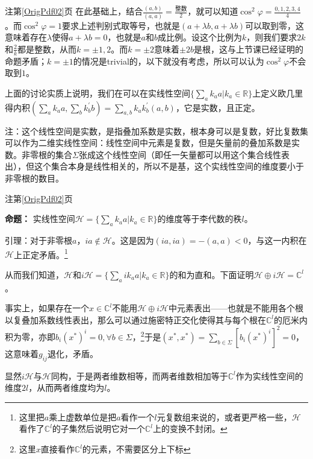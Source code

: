 \documentclass{beamer}
\newcommand{\refpage}[1]{注第\ref{OrigPdf#1}页}%
\begin{document}
\begin{frame}{\refpage{02}}
	在此基础上，结合$\frac{(a,b)}{(a,a)}=\frac{\text{整数}}{2}$，就可以知道$\cos^2\varphi=\frac{0,1,2,3,4}{4}$。而$\cos^2\varphi=1$要求上述判别式取等号，也就是$(a+\lambda b,a+\lambda b)$可以取到零，这意味着存在$\lambda$使得$a+\lambda b=0$，也就是$a$和$b$成比例。设这个比例为$k$，则我们要求$2k$和$\frac{2}{k}$都是整数，从而$k=\pm 1,2$。而$k=\pm 2$意味着$\pm 2b$是根，这与上节课已经证明的命题矛盾；$k=\pm 1$的情况是trivial的，以下就没有考虑，所以可以认为$\cos^2\varphi$不会取到$1$。
	
	上面的讨论实质上说明，我们在可以在实线性空间$\{\sum_a k_a a|k_a\in\mathbb R\}$上定义欧几里得内积$(\sum_a k_a a,\sum_b k_b^\prime b)=\sum_{a,b}k_ak_b^\prime (a,b)$，它是实数，且正定。
	
	注：这个线性空间是实数，是指叠加系数是实数，根本身可以是复数，好比复数集可以作为二维实线性空间：线性空间中元素是复数，但是矢量前的叠加系数是实数。非零根的集合$\Sigma$张成这个线性空间（即任一矢量都可以用这个集合线性表出），但这个集合本身是线性相关的，所以不是基，这个实线性空间的维度要小于非零根的数目。
\end{frame}

\begin{frame}{\refpage{02}}
	
	\textbf{命题：} 实线性空间$\mathcal H=\{\sum_a k_a a|k_a\in\mathbb R\}$的维度等于李代数的秩$l$。

	引理：对于非零根$a$，$ia\notin\mathcal H$。这是因为$(ia,ia)=-(a,a)<0$，与这一内积在$\mathcal H$上正定矛盾。\footnote{这里把$a$乘上虚数单位是把$a$看作一个$l$元复数组来说的，或者更严格一些，$\mathcal H$看作了$\mathbb C^l$的子集然后说明它对一个$\mathbb C^l$上的变换不封闭。}
	
	从而我们知道，$\mathcal H$和$i\mathcal H=\{\sum_a ik_a a|k_a\in\mathbb R\}$的和为直和。下面证明$\mathcal H\oplus i\mathcal H=\mathbb C^l$。
	
	事实上，如果存在一个$x\in \mathbb C^l$不能用$\mathcal H\oplus i\mathcal H$中元素表出——也就是不能用各个根以复叠加系数线性表出，那么可以通过施密特正交化使得其与每个根在$\mathbb C^l$的厄米内积为零，亦即$b_i(x^\ast)^i=0,\forall b\in\Sigma$，\footnote{这里$x$直接看作$\mathbb C^l$的元素，不需要区分上下标}于是$(x^\ast,x^\ast)=\sum_{b\in\Sigma}\left[b_i(x^\ast)^i\right]^2=0$，这意味着$g_{ij}$退化，矛盾。
	
	显然$i\mathcal H$与$\mathcal H$同构，于是两者维数相等，而两者维数相加等于$\mathbb C^l$作为实线性空间的维度$2l$，从而两者维度均为$l$。\qedsymbol
	
\end{frame}
\end{document}
